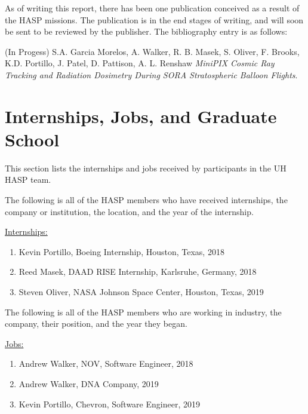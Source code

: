 \begin{appendices}
  \noindent As of writing this report, there has been one publication conceived as a result of the HASP missions.
  The publication is in the end stages of writing, and will soon be sent to be reviewed by the publisher.
  The bibliography entry is as follows:

  \noindent (In Progess) S.A. Garcia Morelos, A. Walker, R. B. Masek, S. Oliver, F. Brooks, K.D. Portillo, J. Patel, D. Pattison, A. L. Renshaw \textit{MiniPIX Cosmic Ray Tracking and Radiation Dosimetry During SORA Stratospheric Balloon Flights}.
  
  \section{Internships, Jobs, and Graduate School}
  \noindent This section lists the internships and jobs received by participants in the UH HASP team.
  
  \vspace{0.5cm}
  
  \noindent The following is all of the HASP members who have received internships, the company or institution, the location, and the year of the internship.
  
  \vspace{0.25cm}
  \noindent\underline{Internships:}
  \begin{enumerate}[leftmargin=3\parindent]
  \item Kevin Portillo, Boeing Internship, Houston, Texas, 2018
  \item Reed Masek, DAAD RISE Internship, Karlsruhe, Germany, 2018
  \item Steven Oliver, NASA Johnson Space Center, Houston, Texas, 2019
  \end{enumerate}

  \vspace{0.5cm}
  
  \noindent The following is all of the HASP members who are working in industry, the company, their position, and the year they began.

  \vspace{0.25cm}
  \noindent\underline{Jobs:}
  \begin{enumerate}[leftmargin=3\parindent]
  \item Andrew Walker, NOV, Software Engineer, 2018
  \item Andrew Walker, DNA Company, 2019
  \item Kevin Portillo, Chevron, Software Engineer, 2019
  \end{enumerate}


\end{appendices}
